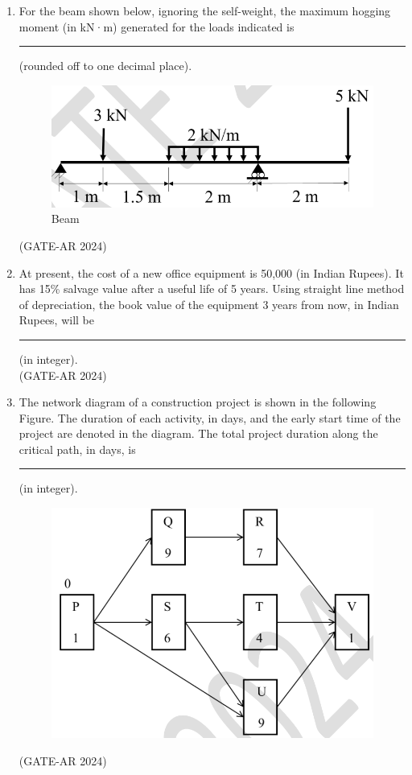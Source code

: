 \documentclass[a4paper,10pt]{article}
\begin{document}
\begin{enumerate}
\newpage

    \item For the beam shown below, ignoring the self-weight, the maximum hogging moment (in kN·m) generated for the loads indicated is \rule{2cm}{0.4pt} (rounded off to one decimal place). \\
    \begin{figure}[h!]
    \centering
    \includegraphics[width=0.5\columnwidth]{figs/10.jpg}
    \caption{Beam}
    \label{fig:Img10}
    \end{figure}
    \hfill (GATE-AR 2024)

    \item At present, the cost of a new office equipment is 50,000 (in Indian Rupees). It has 15\% salvage value after a useful life of 5 years. Using straight line method of depreciation, the book value of the equipment 3 years from now, in Indian Rupees, will be \rule{2cm}{0.4pt} (in integer). \\
    \hfill (GATE-AR 2024)

    \item The network diagram of a construction project is shown in the following Figure. The duration of each activity, in days, and the early start time of the project are denoted in the diagram. The total project duration along the critical path, in days, is \rule{2cm}{0.4pt} (in integer).
    \begin{figure}[h!]
    \centering
    \includegraphics[width=0.5\columnwidth]{figs/11.jpg}
    \caption{}
    \label{fig:Img11}
    \end{figure}
    \hfill (GATE-AR 2024)


\end{enumerate}
\end{document}
